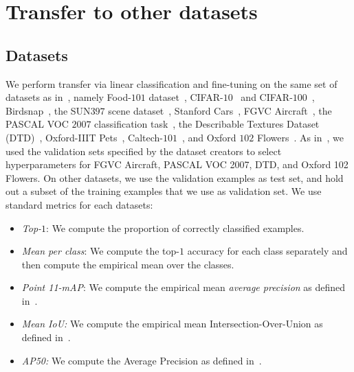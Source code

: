 \clearpage

\section{Transfer to other datasets}
\label{app:transfer_details}

\subsection{Datasets}
\label{app:datasets}
\begin{table}[ht]
   \small
    \centering
    \resizebox{\textwidth}{!}{
    
    }
     \vspace{0.5em}
     \captionsetup{width=.9\linewidth}
     \caption{Characteristics of image datasets used in transfer learning. When an official test split with labels is not publicly available, we use the official validation split as test set, and create a held-out validation set from the training examples.}
     \label{tab:datasets_transfer}
\end{table}
We perform transfer via linear classification and fine-tuning on the same set of datasets as in~\cite{SimCLR}, namely  Food-$101$ dataset~\cite{food101}, CIFAR-$10$~\cite{cifar}
and CIFAR-$100$~\cite{cifar}, Birdsnap~\cite{Birdsnap}, the SUN$397$ scene dataset~\cite{sun397}, Stanford Cars~\cite{carsdataset}, FGVC Aircraft~\cite{aircraft}, the PASCAL VOC $2007$ classification
task~\cite{pascal}, the Describable Textures Dataset (DTD)~\cite{dtd}, Oxford-IIIT Pets~\cite{pets}, Caltech-$101$~\cite{caltech101}, and Oxford $102$ Flowers~\cite{flowers}. As in~\cite{SimCLR}, we used the validation sets specified by the dataset creators to select hyperparameters for FGVC Aircraft, PASCAL VOC
2007, DTD, and Oxford 102 Flowers. On other datasets, we use the validation examples as test set, and hold out a subset of the training examples that we use as validation set. We use standard metrics for each datasets:
\begin{itemize}
    \item \textit{Top-$1$}: We compute the proportion of correctly classified examples.
    \item \textit{Mean per class}: We compute the top-$1$ accuracy for each class separately and then compute the empirical mean over the classes.
    \item \textit{Point 11-mAP}: We compute the empirical mean \emph{average precision} as defined in~\cite{pascal}.
    \item \textit{Mean IoU:} We compute the empirical mean Intersection-Over-Union as defined in~\cite{pascal}.
    \item \textit{AP50:} We compute the Average Precision as defined in~\cite{pascal}.
\end{itemize}

